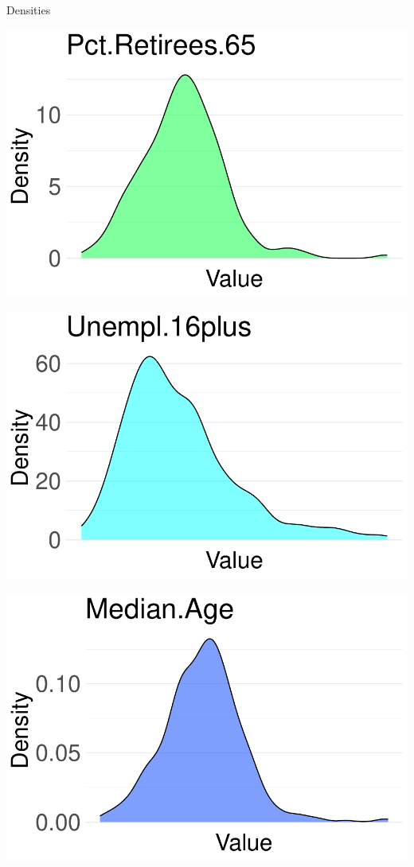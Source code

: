 \documentclass{beamer}
\begin{document}
\begin{frame}{Densities}
    \vspace{0.2cm} %

    \begin{minipage}{0.3\textwidth}
        \centering
        \includegraphics[width=\textwidth]{plots/Pct.Retirees.65_density_plot.pdf}
    \end{minipage}
    \hfill
    \begin{minipage}{0.3\textwidth}
        \centering
        \includegraphics[width=\textwidth]{plots/Unempl.16plus_density_plot.pdf}
    \end{minipage}
    \hfill
    \begin{minipage}{0.3\textwidth}
        \centering
        \includegraphics[width=\textwidth]{plots/Median.Age_density_plot.pdf}

\end{minipage}
\end{frame}
\end{document}
